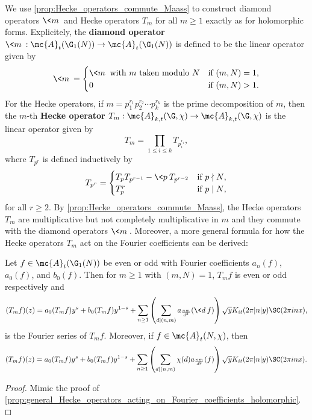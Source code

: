     We use \cref{prop:Hecke_operators_commute_Maass} to construct diamond operators $\<m\>$ and Hecke operators $T_{m}$ for all $m \ge 1$ exactly as for holomorphic forms. Explicitely, the \textbf{diamond operator} $\<m\>:\mc{A}_{t}(\G_{1}(N)) \to \mc{A}_{t}(\G_{1}(N))$ is defined to be the linear operator given by
    \[
      \<m\> = \begin{cases} \<m\> \text{ with $m$ taken modulo $N$} & \text{if $(m,N) = 1$,} \\ 0 & \text{if $(m,N) > 1$.} \end{cases}
    \]
    For the Hecke operators, if $m = p_{1}^{r_{1}}p_{2}^{r_{2}} \cdots p_{k}^{r_{k}}$ is the prime decomposition of $m$, then the $m$-th \textbf{Hecke operator} $T_{m}:\mc{A}_{k,t}(\G,\chi) \to \mc{A}_{k,t}(\G,\chi)$ is the linear operator given by
    \[
      T_{m} = \prod_{1 \le i \le k}T_{p_{i}^{r_{i}}},
    \]
    where $T_{p^{r}}$ is defined inductively by
    \[
      T_{p^{r}} = \begin{cases} T_{p}T_{p^{r-1}}-\<p\>T_{p^{r-2}} & \text{if $p \nmid N$}, \\ T_{p}^{r} & \text{if $p \mid N$}, \end{cases}
    \]
    for all $r \ge 2$. By \cref{prop:Hecke_operators_commute_Maass}, the Hecke operators $T_{m}$ are multiplicative but not completely multiplicative in $m$ and they commute with the diamond operators $\<m\>$. Moreover, a more general formula for how the Hecke operators $T_{m}$ act on the Fourier coefficients can be derived:

    \begin{proposition}\label{prop:general_Hecke_operators_acting_on_Fourier_coefficients_Maass}
      Let $f \in \mc{A}_{t}(\G_{1}(N))$ be even or odd with Fourier coefficients $a_{n}(f)$, $a_{0}(f)$, and $b_{0}(f)$. Then for $m \ge 1$ with $(m,N) = 1$, $T_{m}f$ is even or odd respectively and
      \[
        (T_{m}f)(z) = a_{0}(T_{m}f)y^{s}+b_{0}(T_{m}f)y^{1-s}+\sum_{n \ge 1}\left(\sum_{d \mid (n,m)}a_{\frac{nm}{d^{2}}}(\<d\>f)\right)\sqrt{y}K_{it}(2\pi|n|y)\SC(2\pi inx),
      \]
      is the Fourier series of $T_{m}f$. Moreover, if $f \in \mc{A}_{t}(N,\chi)$, then
      \[
        (T_{m}f)(z) = a_{0}(T_{m}f)y^{s}+b_{0}(T_{m}f)y^{1-s}+\sum_{n \ge 1}\left(\sum_{d \mid (n,m)}\chi(d)a_{\frac{nm}{d^{2}}}(f)\right)\sqrt{y}K_{it}(2\pi|n|y)\SC(2\pi inx).
      \]
    \end{proposition}
    \begin{proof}
      Mimic the proof of \cref{prop:general_Hecke_operators_acting_on_Fourier_coefficients_holomorphic}.
    \end{proof}

